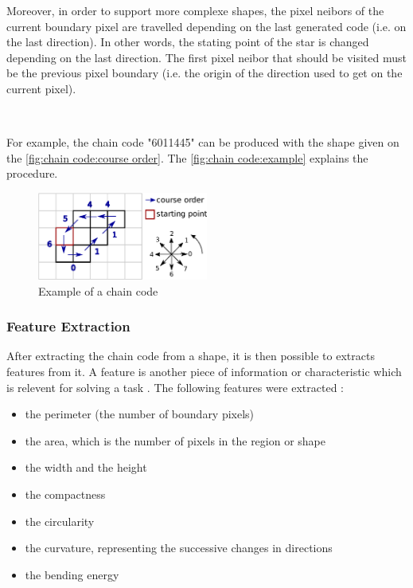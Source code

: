 Moreover, in order to support more complexe shapes, the pixel neibors of the current boundary pixel are travelled depending on the last generated code (i.e. on the last direction). In other words, the stating point of the star is changed depending on the last direction. The first pixel neibor that should be visited must be the previous pixel boundary (i.e. the origin of the direction used to get on the current pixel). 

~~

For example, the chain code "6011445" can be produced with the shape given on the \vref{fig:chain code:course order}. The \vref{fig:chain code:example} explains the procedure. 
\begin{figure}[h]
	\centering
	\includegraphics[width=0.5\textwidth]{images/chain_code/example}
	\caption{Example of a chain code}
	\label{fig:chain code:example}	
\end{figure}


\subsubsection{Feature Extraction}


After extracting the chain code from a shape, it is then possible to extracts features from it. A feature is another piece of information or characteristic which is relevent for solving a task \cite{bib:extraction:definition}. The following features were extracted : 
\begin{itemize}
	\item the perimeter (the number of boundary pixels)
	\item the area, which is the number of pixels in the region or shape 
	\item the width and the height 
	\item the compactness 
	\item the circularity 
	\item the curvature, representing the successive changes in directions 
	\item the bending energy 
\end{itemize}

~~ 

